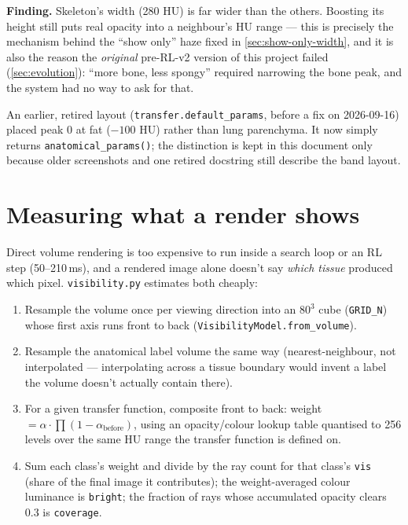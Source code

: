 \documentclass[10pt]{article}
\newcommand{\finding}[1]{\begin{findingbox}\textbf{Finding.} #1\end{findingbox}}
\newcommand{\code}[1]{\texttt{#1}}
\begin{document}
\finding{Skeleton's width (280 HU) is far wider than the others. Boosting its
height still puts real opacity into a neighbour's HU range --- this is
precisely the mechanism behind the ``show only'' haze fixed in
\cref{sec:show-only-width}, and it is also the reason the \emph{original}
pre-RL-v2 version of this project failed (\cref{sec:evolution}): ``more
bone, less spongy'' required narrowing the bone peak, and the system had no
way to ask for that.}

An earlier, retired layout (\code{transfer.default\_params}, before a fix on
2026-09-16) placed peak 0 at fat ($-100$ HU) rather than lung parenchyma. It
now simply returns \code{anatomical\_params()}; the distinction is kept in
this document only because older screenshots and one retired docstring still
describe the band layout.

\newpage
\section{Measuring what a render shows}
\label{sec:measure}

Direct volume rendering is too expensive to run inside a search loop or an
RL step (50--210\,ms), and a rendered image alone doesn't say \emph{which
tissue} produced which pixel. \code{visibility.py} estimates both cheaply:

\begin{enumerate}[itemsep=2pt, topsep=2pt]
\item Resample the volume once per viewing direction into an $80^3$ cube
  (\code{GRID\_N}) whose first axis runs front to back
  (\code{VisibilityModel.from\_volume}).
\item Resample the anatomical label volume the same way (nearest-neighbour,
  not interpolated --- interpolating across a tissue boundary would invent a
  label the volume doesn't actually contain there).
\item For a given transfer function, composite front to back: weight $=
  \alpha \cdot \prod(1-\alpha_{\text{before}})$, using an opacity/colour
  lookup table quantised to 256 levels over the same HU range the transfer
  function is defined on.
\item Sum each class's weight and divide by the ray count for that class's
  \code{vis} (share of the final image it contributes); the weight-averaged
  colour luminance is \code{bright}; the fraction of rays whose accumulated
  opacity clears 0.3 is \code{coverage}.
\end{enumerate}
\end{document}
